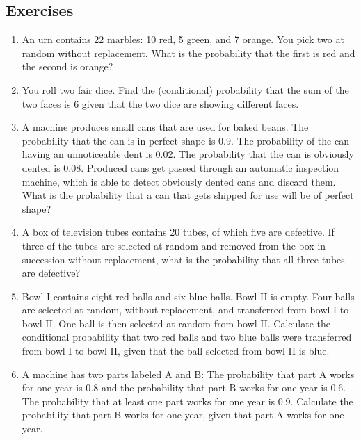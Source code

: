 \documentclass[../main.tex]{subfiles}
\begin{document}
{\fontsize{10}{10}\selectfont

\subsection{Exercises}
\begin{enumerate}
	
	\item An urn contains 22 marbles: 10 red, 5 green, and 7 orange. You pick two at
	random without replacement. What is the probability that the first is red
	and the second is orange?
	
	\item You roll two fair dice. Find the (conditional) probability that the sum of the
	two faces is 6 given that the two dice are showing different faces.
	
	\item A machine produces small cans that are used for baked beans. The probability
	 that the can is in perfect shape is 0.9. The probability of the can having
	an unnoticeable dent is 0.02. The probability that the can is obviously dented
	is 0.08. Produced cans get passed through an automatic inspection machine,
	which is able to detect obviously dented cans and discard them. What is the
	probability that a can that gets shipped for use will be of perfect shape?
	
	\item A box of television tubes contains 20 tubes, of which five are defective. If
	three of the tubes are selected at random and removed from the box in
	succession without replacement, what is the probability that all three tubes
	are defective?
	
	\item Bowl I contains eight red balls and six blue balls. Bowl II is empty. Four
	balls are selected at random, without replacement, and transferred from bowl
	I to bowl II. One ball is then selected at random from bowl II.
	Calculate the conditional probability that two red balls and two blue balls
	were transferred from bowl I to bowl II, given that the ball selected from
	bowl II is blue.
	
	\item A machine has two parts labeled A and B: The probability that part A works
	for one year is 0.8 and the probability that part B works for one year is 0.6.
	The probability that at least one part works for one year is 0.9.
	Calculate the probability that part B works for one year, given that part A
	works for one year.
	

\end{enumerate}}
\end{document}
